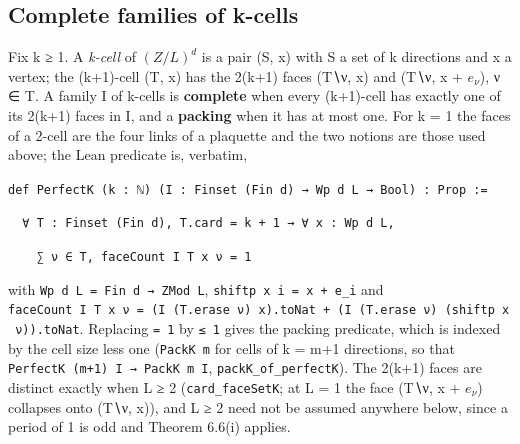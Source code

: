 \documentclass[11pt,a4paper]{article}
\theoremstyle{named}
\begin{document}
\subsection*{Complete families of k-cells}
Fix k ≥ 1. A \textit{k-cell} of $(Z/L)^d$ is a pair (S, x) with S a set of k directions and x a vertex; the (k+1)-cell (T, x) has the 2(k+1) faces (T∖ν, x) and (T∖ν, x + $e_{ν}$), ν ∈ T. A family I of k-cells is \textbf{complete} when every (k+1)-cell has exactly one of its 2(k+1) faces in I, and a \textbf{packing} when it has at most one. For k = 1 the faces of a 2-cell are the four links of a plaquette and the two notions are those used above; the Lean predicate is, verbatim,

\begin{leancode}
\item \texttt{def\ \allowbreak{}PerfectK\ \allowbreak{}(k\ \allowbreak{}:\ \allowbreak{}ℕ)\ \allowbreak{}(I\ \allowbreak{}:\ \allowbreak{}Finset\ \allowbreak{}(Fin\ \allowbreak{}d)\ \allowbreak{}→\ \allowbreak{}Wp\ \allowbreak{}d\ \allowbreak{}L\ \allowbreak{}→\ \allowbreak{}Bool)\ \allowbreak{}:\ \allowbreak{}Prop\ \allowbreak{}:=}
\item \texttt{\ \allowbreak{}\ \allowbreak{}∀\ \allowbreak{}T\ \allowbreak{}:\ \allowbreak{}Finset\ \allowbreak{}(Fin\ \allowbreak{}d),\ \allowbreak{}T.\allowbreak{}card\ \allowbreak{}=\ \allowbreak{}k\ \allowbreak{}+\ \allowbreak{}1\ \allowbreak{}→\ \allowbreak{}∀\ \allowbreak{}x\ \allowbreak{}:\ \allowbreak{}Wp\ \allowbreak{}d\ \allowbreak{}L,}
\item \texttt{\ \allowbreak{}\ \allowbreak{}\ \allowbreak{}\ \allowbreak{}∑\ \allowbreak{}ν\ \allowbreak{}∈\ \allowbreak{}T,\ \allowbreak{}faceCount\ \allowbreak{}I\ \allowbreak{}T\ \allowbreak{}x\ \allowbreak{}ν\ \allowbreak{}=\ \allowbreak{}1}
\end{leancode}
with \texttt{Wp\ \allowbreak{}d\ \allowbreak{}L\ \allowbreak{}=\ \allowbreak{}Fin\ \allowbreak{}d\ \allowbreak{}→\ \allowbreak{}ZMod\ \allowbreak{}L}, \texttt{shiftp\ \allowbreak{}x\ \allowbreak{}i\ \allowbreak{}=\ \allowbreak{}x\ \allowbreak{}+\ \allowbreak{}e\_\allowbreak{}i} and \texttt{faceCount\ \allowbreak{}I\ \allowbreak{}T\ \allowbreak{}x\ \allowbreak{}ν\ \allowbreak{}=\ \allowbreak{}(I\ \allowbreak{}(T.\allowbreak{}erase\ \allowbreak{}ν)\ \allowbreak{}x).\allowbreak{}toNat\ \allowbreak{}+\ \allowbreak{}(I\ \allowbreak{}(T.\allowbreak{}erase\ \allowbreak{}ν)\ \allowbreak{}(shiftp\ \allowbreak{}x\ \allowbreak{}ν)).\allowbreak{}toNat}. Replacing \texttt{=\ \allowbreak{}1} by \texttt{≤\ \allowbreak{}1} gives the packing predicate, which is indexed by the cell size less one (\texttt{PackK\ \allowbreak{}m} for cells of k = m+1 directions, so that \texttt{PerfectK\ \allowbreak{}(m+1)\ \allowbreak{}I\ \allowbreak{}→\ \allowbreak{}PackK\ \allowbreak{}m\ \allowbreak{}I}, \texttt{packK\_\allowbreak{}of\_\allowbreak{}perfectK}). The 2(k+1) faces are distinct exactly when L ≥ 2 (\texttt{card\_\allowbreak{}faceSetK}; at L = 1 the face (T∖ν, x + $e_{ν}$) collapses onto (T∖ν, x)), and L ≥ 2 need not be assumed anywhere below, since a period of 1 is odd and Theorem 6.6(i) applies.
\end{document}
